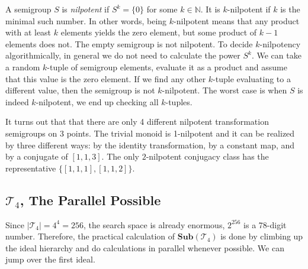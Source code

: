 \documentclass{amsart}
\newcommand{\cT}{{\mathcal T}}
\newcommand{\Sub}{\mathbf{Sub}}
\theoremstyle{plain}
\theoremstyle{definition}
\begin{document}
A semigroup $S$ is \emph{nilpotent} if $S^k=\{0\}$ for some $k\in\mathbb{N}$.
It is $k$-nilpotent if $k$ is the minimal such number.
 In other words, being $k$-nilpotent means that any product with at least $k$ elements yields the zero element, but some product of $k-1$ elements does not.
The empty semigroup is not nilpotent.
To decide $k$-nilpotency algorithmically, in general we do not need to calculate the power $S^k$.
We can take a random $k$-tuple of semigroup elements, evaluate it as a product and assume that this value is the zero element.
If we find any other $k$-tuple evaluating to a different value, then the semigroup is not $k$-nilpotent.
The worst case is when $S$ is indeed $k$-nilpotent, we end up checking all $k$-tuples.

It turns out that that there are only 4 different nilpotent transformation semigroups on 3 points.
The trivial monoid is 1-nilpotent and it can be realized by three different ways: by the identity transformation, by a constant map, and by a conjugate of $[1,1,3]$.
The only $2$-nilpotent conjugacy class has the representative $\{[1,1,1],[1,1,2]\}$.

\subsection{$\cT_4$, The Parallel Possible }
Since $|\cT_4|=4^4=256$, the search space is already enormous, $2^{256}$ is a 78-digit number.
Therefore, the practical calculation of  $\Sub(\cT_4)$ is done by climbing up the ideal hierarchy and do calculations in parallel whenever possible.
We can jump over the first ideal.
\end{document}
